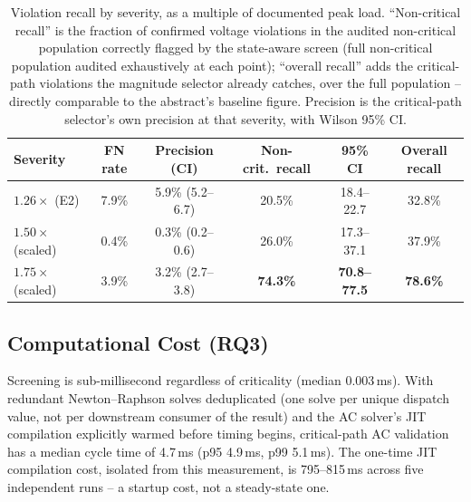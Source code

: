 \documentclass[11pt,conference]{IEEEtran}
\begin{document}
\begin{table}[htbp]
\caption{Violation recall by severity, as a multiple of documented peak load. ``Non-critical recall'' is the fraction of confirmed voltage violations in the audited non-critical population correctly flagged by the state-aware screen (full non-critical population audited exhaustively at each point); ``overall recall'' adds the critical-path violations the magnitude selector already catches, over the full population -- directly comparable to the abstract's baseline figure. Precision is the critical-path selector's own precision at that severity, with Wilson 95\% CI.}
\label{tab:sensitivity}
\centering
\scriptsize
\setlength{\tabcolsep}{2.3pt}
\begin{tabular}{@{}lccccc@{}}
\toprule
\textbf{Severity} & \textbf{FN rate} & \textbf{Precision (CI)} & \textbf{Non-crit.\ recall} & \textbf{95\% CI} & \textbf{Overall recall} \\ \midrule
$1.26\times$ (E2) & 7.9\% & 5.9\% (5.2--6.7) & 20.5\% & 18.4--22.7 & 32.8\% \\
$1.50\times$ (scaled) & 0.4\% & 0.3\% (0.2--0.6) & 26.0\% & 17.3--37.1 & 37.9\% \\
$1.75\times$ (scaled) & 3.9\% & 3.2\% (2.7--3.8) & \textbf{74.3\%} & \textbf{70.8--77.5} & \textbf{78.6\%} \\ \bottomrule
\end{tabular}
\end{table}

\subsection{Computational Cost (RQ3)}
\label{sec:cost}
Screening is sub-millisecond regardless of criticality (median 0.003\,ms). With redundant
Newton--Raphson solves deduplicated (one solve per unique dispatch value, not per downstream
consumer of the result) and the AC solver's JIT compilation explicitly warmed before timing begins,
critical-path AC validation has a median cycle time of 4.7\,ms (p95 4.9\,ms, p99 5.1\,ms). The
one-time JIT compilation cost, isolated from this measurement, is 795--815\,ms across five
independent runs -- a startup cost, not a steady-state one.
\end{document}
